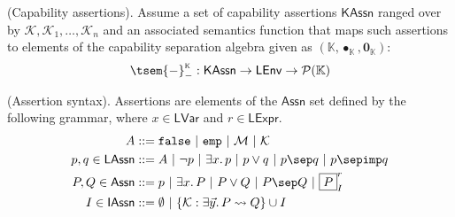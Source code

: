 \param (Capability assertions). Assume a set of capability assertions $\mathsf{KAssn}$ ranged over by $\mathcal{K}, \mathcal{K}_1, \ldots, \mathcal{K}_n$ and an associated semantics function that maps such assertions to elements of the capability separation algebra given as $(\mathbb{K}, \bullet_\mathbb{K}, \mathbf{0}_\mathbb{K})$:
\[
	\tsem{-}_-^\textsc{k} : \mathsf{KAssn} \rightarrow \mathsf{LEnv} \rightarrow \mathcal{P}(\mathbb{K})
\]

 (Assertion syntax). Assertions are elements of the $\mathsf{Assn}$ set defined by the following grammar, where $x \in \mathsf{LVar}$ and $r \in \mathsf{LExpr}$.
\begin{align*}
A &::= \mathtt{false}\ |\ \mathtt{emp}\ |\ \mathcal{M}\ |\ \mathcal{K} \\
p, q \in \mathsf{LAssn} &::= A\ |\ \lnot p\ |\ \exists x \ldotp p\ |\ p \lor q\ |\ p \sep q\ |\ p \sepimp q \\
P, Q \in \mathsf{Assn} &::= p\ |\ \exists x \ldotp P\ |\ P \lor Q\ |\ P \sep Q\ |\ \boxed{P}_I^r \\
I \in \mathsf{IAssn} &::= \emptyset\ |\ \{ \mathcal{K} : \exists \vec{y} \ldotp P \leadsto Q \} \cup I
\end{align*}


